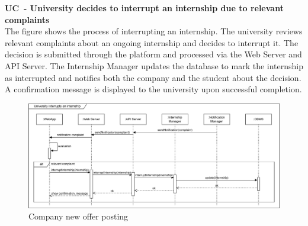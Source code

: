 \textbf{UC\cuc\  - University decides to interrupt an internship due to relevant complaints} \\
The figure shows the process of interrupting an internship. The university reviews relevant complaints about an ongoing internship and decides to interrupt it. The decision is submitted through the platform and processed via the Web Server and API Server. The Internship Manager updates the database to mark the internship as interrupted and notifies both the company and the student about the decision. A confirmation message is displayed to the university upon successful completion.
\begin{center}
    \begin{figure}[H]
        \centering
        \includegraphics[width=1\linewidth]{Images/Sequence diagrams/UC16.png}
        \caption{Company new offer posting}
        \label{fig:enter-label}
    \end{figure}
\end{center}


